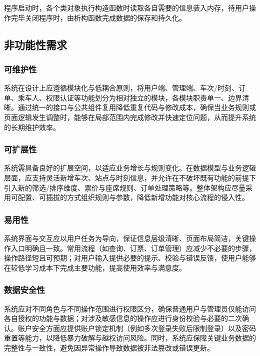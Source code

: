 \documentclass{article}
\begin{document}
	
	程序启动时，各个类对象执行构造函数时读取各自需要的信息装入内存，待用户操作完毕关闭程序时，由析构函数完成数据的保存和持久化。
	
	
	\subsection{非功能性需求}
	\subsubsection{可维护性}
	系统在设计上应遵循模块化与低耦合原则，将用户端、管理端、车次/时刻、订单、乘车人、权限认证等功能划分为相对独立的模块，各模块职责单一、边界清晰。通过统一的接口与公共组件复用降低重复代码与修改成本，确保当业务规则或页面逻辑发生调整时，能够在局部范围内完成修改并快速定位问题，从而提升系统的长期维护效率。
	
	\subsubsection{可扩展性}
	系统需具备良好的扩展空间，以适应业务增长与规则变化。在数据模型与业务逻辑层面，应支持灵活新增车次、站点与时刻信息，并允许在不破坏既有功能的前提下引入新的筛选/排序维度、票价与座席规则、订单处理策略等。整体架构应尽量采用可配置、可插拔的方式组织规则与参数，降低新增功能对核心流程的侵入性。
	
	\subsubsection{易用性}
	系统界面与交互应以用户任务为导向，保证信息层级清晰、页面布局简洁，关键操作入口明确且一致。常用流程（如查询、订票、订单管理）应减少不必要的步骤，操作路径短且可预期；对用户输入提供必要的提示、校验与错误反馈，使用户能够在较低学习成本下完成主要功能，提高使用效率与满意度。
	
	\subsubsection{数据安全性}
	系统应对不同角色与不同操作范围进行权限区分，确保普通用户与管理员仅能访问各自授权的功能与数据；对涉及敏感信息的操作应进行身份校验与必要的二次确认。账户安全方面应提供账户锁定机制（例如多次登录失败后限制登录）以及密码重置等能力，以降低暴力破解与越权访问风险。同时，系统应保障关键业务数据的完整性与一致性，避免因异常操作导致数据被非法篡改或错误更新。
\end{document}
